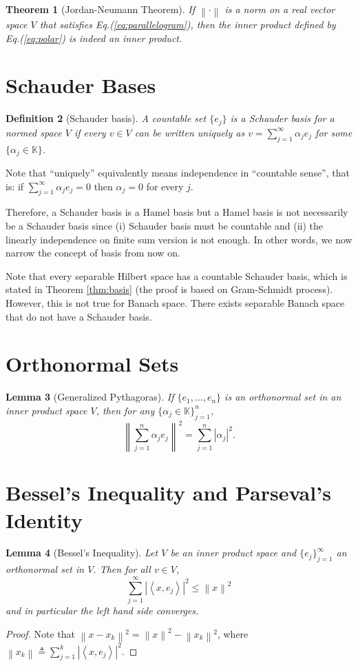 \documentclass[12pt,a4paper]{report}
\numberwithin{equation}{section}
\theoremstyle{mystyle}
\newtheorem{definition}{Definition}[section]
\newtheorem{theorem}[definition]{Theorem}
\newtheorem{lemma}[definition]{Lemma}
\newcommand{\K}{\mathbb{K}}
\newcommand{\abs}[1]{\left\lvert #1 \right\rvert}
\newcommand{\norm}[1]{\left\lVert #1 \right\rVert}
\newcommand{\inner}[1]{\left\langle #1 \right\rangle}
\begin{document}
	\begin{theorem}[Jordan-Neumann Theorem]
		If $\norm{\cdot}$ is a norm on a real vector space $V$ that satisfies Eq.(\ref{eq:parallelogram}), then the inner product defined by Eq.(\ref{eq:polar}) is indeed an inner product.
	\end{theorem}
	
	
	
	\section{Schauder Bases}
	\begin{definition}[Schauder basis]
		A countable set $\{e_j\}$ is a \emph{Schauder basis} for a normed space $V$ if every $v\in V$ can be written uniquely as $v=\sum_{j=1}^\infty \alpha_j e_j$ for some $\{\alpha_j\in \K\}$.
	\end{definition}
	Note that ``uniquely'' equivalently means independence in ``countable sense'', that is: if $\sum_{j=1}^\infty \alpha_j e_j=0$ then $\alpha_j=0$ for every $j$.
	
	Therefore, a Schauder basis is a Hamel basis but a Hamel basis is not necessarily be a Schauder basis since (i) Schauder basis must be countable and (ii) the linearly independence on finite sum version is not enough. In other words, we now narrow the concept of basis from now on.
	
	Note that every separable Hilbert space has a countable Schauder basis, which is stated in Theorem \ref{thm:basis} (the proof is based on Gram-Schmidt process). However, this is not true for Banach space. There exists separable Banach space that do not have a Schauder basis.
	\section{Orthonormal Sets}
	\begin{lemma}[Generalized Pythagoras]
		If $\{e_1,\dots,e_n\}$ is an orthonormal set in an inner product space $V$, then for any $\{\alpha_j\in \K\}_{j=1}^n$,
		\begin{equation}
			\norm{\sum_{j=1}^n \alpha_j e_j}^2 = \sum_{j=1}^n \abs{\alpha_j}^2.
		\end{equation}
	\end{lemma}

	\section{Bessel's Inequality and Parseval's Identity}
	\begin{lemma}[Bessel's Inequality]
		Let $V$ be an inner product space and $\{e_j\}_{j=1}^\infty$ an orthonormal set in $V$. Then for all $v\in V$,
		\begin{equation}
			\sum_{j=1}^\infty \abs{\inner{x,e_j}}^2\leq \norm{x}^2 \label{eq:Bessel}
		\end{equation}
		and in particular the left hand side converges.
	\end{lemma}
	\begin{proof}
		Note that $\norm{x-x_k}^2=\norm{x}^2-\norm{x_k}^2$, where $\norm{x_k}\triangleq \sum_{j=1}^k \abs{\inner{x,e_j}}^2$.
	\end{proof}
\end{document}
